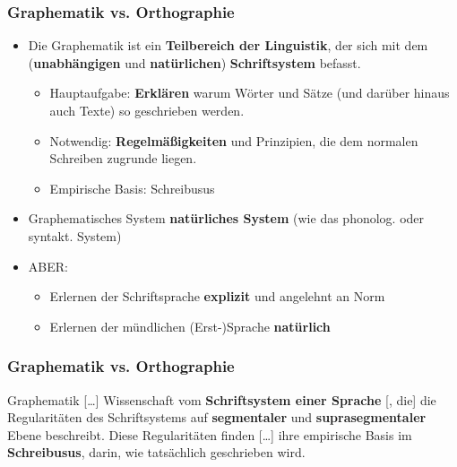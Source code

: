 \begin{frame}
\frametitle{Graphematik vs. Orthographie}

	\begin{itemize}
		\item Die Graphematik ist ein \textbf{Teilbereich der Linguistik}, der sich mit dem (\textbf{unabhängigen} und \textbf{natürlichen}) \textbf{Schriftsystem} befasst.
		
		\begin{itemize}
			\item Hauptaufgabe: \textbf{Erklären} \ras warum Wörter und Sätze (und darüber hinaus auch Texte) so geschrieben werden.
			\item Notwendig: \textbf{Regelmäßigkeiten} und Prinzipien, die dem normalen Schreiben zugrunde liegen.
			\item Empirische Basis: Schreibusus
		\end{itemize}
			
		\item Graphematisches System \ras \textbf{natürliches System} (wie das phonolog. oder syntakt. System)
		\item ABER:
		
		\begin{itemize}
			\item Erlernen der Schriftsprache \ras \textbf{explizit} und angelehnt an Norm
			\item Erlernen der mündlichen (Erst-)Sprache \ras \textbf{natürlich}	
		\end{itemize}
	\end{itemize}
\end{frame}


\begin{frame}
\frametitle{Graphematik vs. Orthographie}

\begin{block}{Graphematik}
	[\ldots] Wissenschaft vom \textbf{Schriftsystem einer Sprache} [, die] die Regularitäten des Schriftsystems auf \textbf{segmentaler} und \textbf{suprasegmentaler} Ebene beschreibt. Diese Regularitäten finden [\ldots] ihre empirische Basis im \textbf{Schreibusus}, \dash darin, wie tatsächlich geschrieben wird. \citep[vgl.][140]{Duerscheid04a}
\end{block}

\end{frame}


